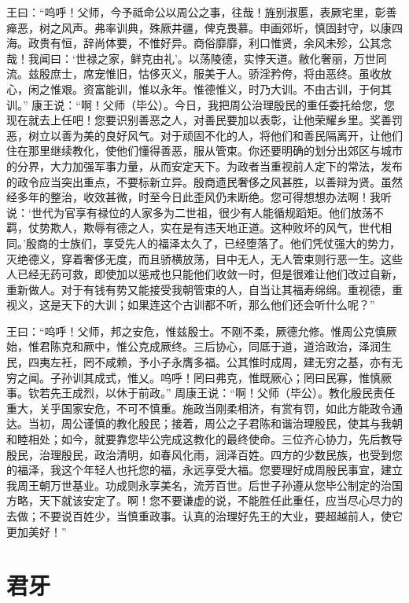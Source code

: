 \documentclass[12pt,UTF8]{ctexbook}
\begin{document}
王曰：“呜呼！父师，今予祗命公以周公之事，往哉！旌别淑慝，表厥宅里，彰善瘅恶，树之风声。弗率训典，殊厥井疆，俾克畏慕。申画郊圻，慎固封守，以康四海。政贵有恒，辞尚体要，不惟好异。商俗靡靡，利口惟贤，余风未殄，公其念哉！我闻曰：‘世禄之家，鲜克由礼’。以荡陵德，实悖天道。敝化奢丽，万世同流。兹殷庶士，席宠惟旧，怙侈灭义，服美于人。骄淫矜侉，将由恶终。虽收放心，闲之惟艰。资富能训，惟以永年。惟德惟义，时乃大训。不由古训，于何其训。”
康王说：“啊！父师（毕公）。今日，我把周公治理殷民的重任委托给您，您现在就去上任吧！您要识别善恶之人，对善民要加以表彰，让他荣耀乡里。奖善罚恶，树立以善为美的良好风气。对于顽固不化的人，将他们和善民隔离开，让他们住在那里继续教化，使他们懂得善恶，服从管束。你还要明确的划分出郊区与城市的分界，大力加强军事力量，从而安定天下。为政者当重视前人定下的常法，发布的政令应当突出重点，不要标新立异。殷商遗民奢侈之风甚胜，以善辩为贤。虽然经多年的整治，收效甚微，时至今日此歪风仍未断绝。您可得想想办法啊！我听说：‘世代为官享有禄位的人家多为二世祖，很少有人能循规蹈矩。他们放荡不羁，仗势欺人，欺辱有德之人，实在是有违天地正道。这种败坏的风气，世代相同。’殷商的士族们，享受先人的福泽太久了，已经堕落了。他们凭仗强大的势力，灭绝德义，穿着奢侈无度，而且骄横放荡，目中无人，无人管束则行恶一生。这些人已经无药可救，即使加以惩戒也只能他们收敛一时，但是很难让他们改过自新，重新做人。对于有钱有势又能接受我朝管束的人，自当让其福寿绵绵。重视德，重视义，这是天下的大训；如果连这个古训都不听，那么他们还会听什么呢？”

王曰：“呜呼！父师，邦之安危，惟兹殷士。不刚不柔，厥德允修。惟周公克慎厥始，惟君陈克和厥中，惟公克成厥终。三后协心，同厎于道，道洽政治，泽润生民，四夷左衽，罔不咸赖，予小子永膺多福。公其惟时成周，建无穷之基，亦有无穷之闻。子孙训其成式，惟乂。呜呼！罔曰弗克，惟既厥心；罔曰民寡，惟慎厥事。钦若先王成烈，以休于前政。”
周康王说：“啊！父师（毕公）。教化殷民责任重大，关乎国家安危，不可不慎重。施政当刚柔相济，有赏有罚，如此方能政令通达。当初，周公谨慎的教化殷民；接着，周公之子君陈和谐治理殷民，使其与我朝和睦相处；如今，就要靠您毕公完成这教化的最终使命。三位齐心协力，先后教导殷民，治理殷民，政治清明，如春风化雨，润泽百姓。四方的少数民族，也受到您的福泽，我这个年轻人也托您的福，永远享受大福。您要理好成周殷民事宜，建立我周王朝万世基业。功成则永享美名，流芳百世。后世子孙遵从您毕公制定的治国方略，天下就该安定了。啊！您不要谦虚的说，不能胜任此重任，应当尽心尽力的去做；不要说百姓少，当慎重政事。认真的治理好先王的大业，要超越前人，使它更加美好！”

\chapter{君牙}
\end{document}
